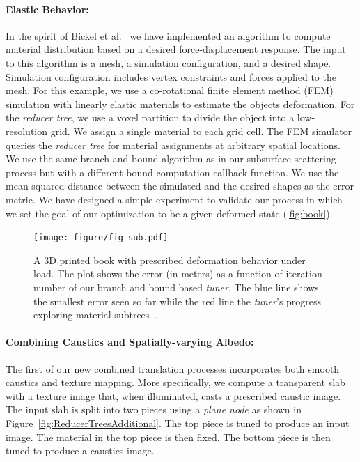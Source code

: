 \paragraph{Elastic Behavior:}
In the spirit of Bickel et al.~ we have implemented an algorithm to compute material distribution based on a desired force-displacement response. The input to this algorithm is a mesh, a simulation configuration, and a desired shape. Simulation configuration includes vertex constraints and forces applied to the mesh. For this example, we use a co-rotational finite element method (FEM) simulation with linearly elastic materials to estimate the objects deformation. For the \emph{reducer tree}, we use a voxel partition to divide the object into a low-resolution grid. We assign a single material to each grid cell. The FEM simulator queries the \emph{reducer tree} for material assignments at arbitrary spatial locations. We use the same branch and bound algorithm as in our subsurface-scattering process but with a different bound computation callback function. We use the mean squared distance between the simulated and the desired shapes as the error metric. We have designed a simple experiment to validate our process in which we set the goal of our optimization to be a given deformed state (\autoref{fig:book}).

\begin{figure}
\centering
\texttt{[image: figure/fig\_sub.pdf]}
\caption {A 3D printed book with prescribed deformation behavior under load.
The plot shows the error (in meters) as a function of iteration number of our branch and bound based \emph{tuner}.
The blue line shows the smallest error seen so far while the red line the \emph{tuner}'s progress exploring material subtrees~\protect\cite{Bickel:2009}.}
\label{fig:book}
\end{figure}

\paragraph{Combining Caustics and Spatially-varying Albedo:}
The first of our new combined translation processes incorporates both smooth caustics and texture mapping. More specifically, we compute a transparent slab with a texture image that, when illuminated, casts a prescribed caustic image. The input slab is split into two pieces using a \emph{plane node} as shown in Figure~\ref{fig:ReducerTreesAdditional}.
The top piece is tuned to produce an input image. The material in the top piece is then fixed. The bottom piece is then tuned to produce a caustics image.


